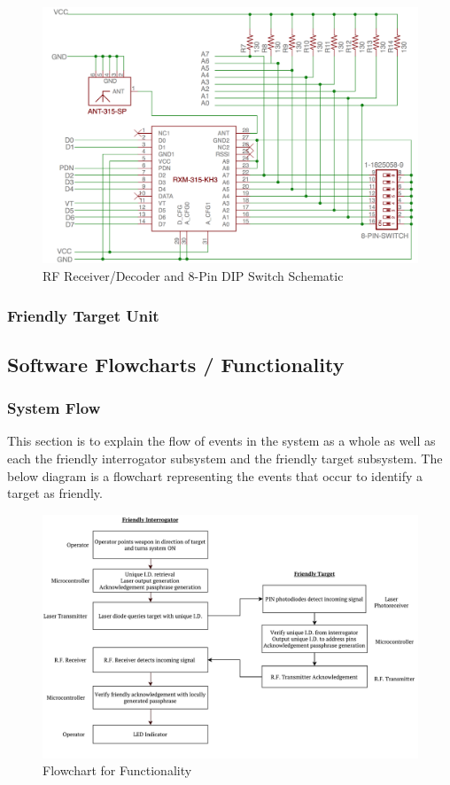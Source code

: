 \documentclass[letterpaper,10pt]{article}
\begin{document}
\begin{spacing}{1.15}
\begin{figure} [H]
	\centering
	\includegraphics[scale=0.5]{RF_Receiver_Decoder_Schematic.png}
	\caption{RF Receiver/Decoder and 8-Pin DIP Switch Schematic\label{fig:rf-receiver-decoder-schematic}}
\end{figure}


\subsubsection{Friendly Target Unit}

\subsection{Software Flowcharts / Functionality}
\subsubsection{System Flow}
This section is to explain the flow of events in the system as a whole as well as each the friendly interrogator subsystem and the friendly target subsystem. The below diagram is a flowchart representing the events that occur to identify a target as friendly.

\begin{figure} [H]
	\centering
	\includegraphics[scale=0.55]{Functionality_Flowchart.pdf}
	\caption{Flowchart for Functionality\label{fig:circuit-schematic}}
\end{figure}


\end{spacing}
\end{document}
